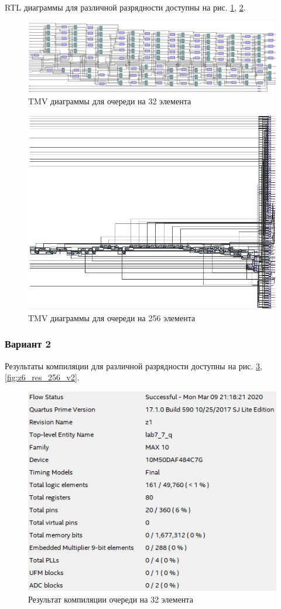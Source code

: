 \documentclass[a4paper,14pt]{article}
\begin{document}
		RTL диаграммы для различной разрядности доступны на рис. \ref{fig:z6_tmv_32_v1}, \ref{fig:z6_tmv_256_v1}.
		
		\begin{figure}[H]
			\centering
			\includegraphics[width=0.8\linewidth]{images/z6_tmv_32_v1}
			\caption{TMV диаграммы для очереди на 32 элемента}
			\label{fig:z6_tmv_32_v1}
		\end{figure}
		
		\begin{figure}[H]
			\centering
			\includegraphics[width=0.5\linewidth]{images/z6_tmv_256_v1}
			\caption{TMV диаграммы для очереди на 256 элемента}
			\label{fig:z6_tmv_256_v1}
		\end{figure}
	
	\subsubsection{Вариант 2}
	
	
		Результаты компиляции для различной разрядности доступны на рис. \ref{fig:z6_res_32_v2}, \ref{fig:z6_res_256_v2}.
		
		\begin{figure}[H]
			\centering
			\includegraphics[width=0.8\linewidth]{images/z6_res_32_v2}
			\caption{Результат компиляции очереди на 32 элемента}
			\label{fig:z6_res_32_v2}
		\end{figure}
		
\end{document}

